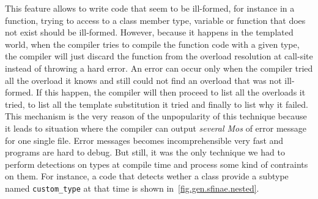 This feature allows to write code that seem to be ill-formed, for instance in a function, trying to access to a class
member type, variable or function that does not exist should be ill-formed. However, because it happens in the templated
world, when the compiler tries to compile the function code with a given type, the compiler will just discard the
function from the overload resolution at call-site instead of throwing a hard error. An error can occur only when the
compiler tried all the overload it knows and still could not find an overload that was not ill-formed. If this happen,
the compiler will then proceed to list all the overloads it tried, to list all the template substitution it tried and
finally to list why it failed. This mechanism is the very reason of the unpopularity of this technique because it leads
to situation where the compiler can output \emph{several Mos} of error message for one single file. Error messages
becomes incomprehensible very fast and programs are hard to debug. But still, it was the only technique we had to
perform detections on types at compile time and process some kind of contraints on them. For instance, a code that
detects wether a class provide a subtype named \texttt{custom\_type} at that time is shown
in~\cref{fig.gen.sfinae.nested}.

